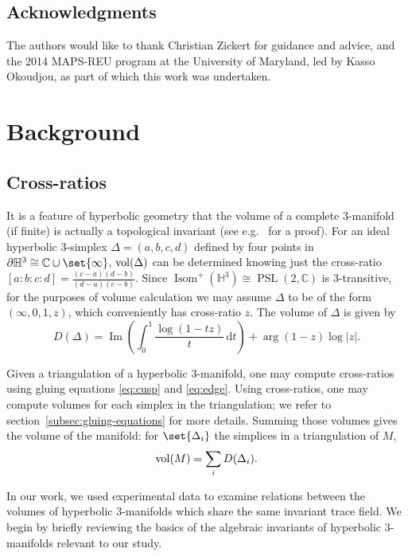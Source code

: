 \documentclass[10pt]{amsart}
\numberwithin{equation}{theorem}
\theoremstyle{definition}
\DeclareMathOperator{\im}{Im}
\newcommand{\Isom}{\operatorname{Isom}}
\newcommand{\PSL}{\operatorname{PSL}}
\newcommand{\crossratio}[4]{[#1\mathop{:}#2\mathop{:}#3\mathop{:}#4]}
\newcommand{\dx}[1]{\, \mathrm{d} {#1}}
\begin{document}
\subsection*{Acknowledgments}

The authors would like to thank Christian Zickert for guidance and
advice, and the 2014 MAPS-REU program at the University of Maryland,
led by Kasso Okoudjou, as part of which this work was undertaken.

\section{Background}

\subsection{Cross-ratios}

It is a feature of hyperbolic geometry that the volume of a complete
3-manifold (if finite) is actually a topological invariant (see e.g.\
\parencite[83]{benedetti1992lectures} for a proof). For an ideal
hyperbolic 3-simplex $\Delta = (a,b,c,d)$ defined by four points in
$\partial \mathbb{H}^3 \cong \mathbb{C} \cup \set{\infty}$,
$\operatorname{vol}(\Delta)$ can be determined knowing just the cross-ratio
$\crossratio{a}{b}{c}{d} = \frac{(c-a)(d-b)}{(d-a)(c-b)}$.  Since
$\Isom^{+}(\mathbb{H}^3) \cong \PSL(2, \mathbb{C})$ is 3-transitive,
for the purposes of volume calculation we may assume $\Delta$ to be of
the form $(\infty,0,1,z)$, which conveniently has cross-ratio $z$. The
volume of $\Delta$ is given by
\begin{equation}
  \label{eq:D}
  D(\Delta) = \im \left( \int_0^1 \frac{\log (1 - tz)}{t} \dx{t} \right) + \arg(1 - z) \log |z|.
\end{equation}

Given a triangulation of a hyperbolic 3-manifold, one may compute
cross-ratios using gluing equations \ref{eq:cusp} and
\ref{eq:edge}. Using cross-ratios, one may compute volumes for each
simplex in the triangulation; we refer to
section~\ref{subsec:gluing-equations} for more details. Summing those
volumes gives the volume of the manifold: for $\set{\Delta_i}$ the
simplices in a triangulation of $M$,
\begin{equation}
  \label{eq:sum-of-simplex-vols}
  \operatorname{vol}(M) = \sum_i D(\Delta_i).
\end{equation}

In our work, we used experimental data to examine relations between
the volumes of hyperbolic 3-manifolds which share the same invariant
trace field.  We begin by briefly reviewing the basics of the algebraic
invariants of hyperbolic 3-manifolds relevant to our study.
\end{document}
